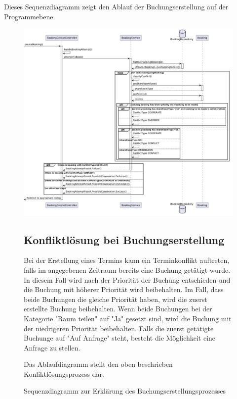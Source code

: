 Dieses Sequenzdiagramm zeigt den Ablauf der Buchungserstellung auf der Programmebene.

\begin{figure}[ht]
    \centering
    \includegraphics[width=\textwidth]{figures/activity/SequenzdiagrammBuchungErstellen}
    \caption{Sequenzdiagramm zur Erklärung des Buchungserstellungsprozesses}
    \label{fig:make-booking-sequence-diagram}

\subsection{Konfliktlösung bei Buchungserstellung}

Bei der Erstellung eines Termins kann ein Terminkonflikt auftreten, falls im angegebenen Zeitraum bereits eine
Buchung getätigt wurde. In diesem Fall wird nach der Priorität der Buchung entschieden und die Buchung mit
höherer Priorität wird beibehalten. Im Fall, dass beide Buchungen die gleiche Priorität haben, wird die zuerst
erstellte Buchung beibehalten. Wenn beide Buchungen bei der Kategorie "Raum teilen" auf "Ja" gesetzt sind, wird die
Buchung mit der niedrigeren Priorität beibehalten. Falls die zuerst getätigte Buchunge auf "Auf Anfrage" steht,
besteht die Möglichkeit eine Anfrage zu stellen.

Das Ablaufdiagramm stellt den oben beschrieben Konliktlösungsprozess dar.


\end{figure}
